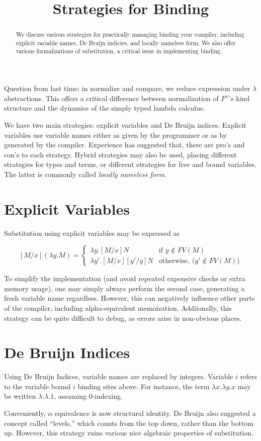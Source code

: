 \documentclass{amsart}
\title{Strategies for Binding}
\newcommand{\defn}[1]{\textit{#1}}
\begin{document}
\maketitle

\begin{abstract}
  We discuss various strategies for practically managing binding your compiler, including explicit variable names, De Bruijn indicies, and locally nameless form. We also offer various formalizations of substitution, a critical issue in implementing binding.
\end{abstract}

Question from last time: in normalize and compare, we reduce expression under $\lambda$ abstractions. This offers a critical difference between normalization of $F^\omega$'s kind structure and the dynamics of the simply typed lambda calculus.

We have two main strategies: explicit variables and De Bruijn indices. Explicit variables use variable names either as given by the programmer or as by generated by the compiler. Experience has suggested that, there are pro's and con's to each strategy. Hybrid strategies may also be used, placing different strategies for types and terms, or different strategies for free and bound variables. The latter is commonly called \defn{locally nameless form}.

\section{Explicit Variables}

Substitution using explicit variables may be expressed as

\[
  [M/x](\lambda y. M) = \begin{cases}
  \lambda y. [M/x]N& \text{if $y \not\in FV(M)$}\\
  \lambda y'. [M/x][y'/y]N& \text{otherwise, ($y' \not\in FV(M)$)}
  \end{cases}
\]

To simplify the implementation (and avoid repeated expensive checks or extra memory usage), one may simply always perform the second case, generating a fresh variable name regardless. However, this can negatively influence other parts of the compiler, including alpha-equivalent memoization. Addiionally, this strategy can be quite difficult to debug, as errors arise in non-obvious places.

\section{De Bruijn Indices}
Using De Bruijn Indices, variable names are replaced by integers. Variable $i$ refers to the variable bound $i$ binding sites above. For instance, the term $\lambda x. \lambda y. x$ may be written $\lambda. \lambda. 1$, assuming 0-indexing.

Conveniently, $\alpha$ equivalence is now structural identity. De Bruijn also suggested a concept called ``levels,'' which counts from the top down, rather than the bottom up. However, this strategy ruins various nice algebraic properties of substitution.
\end{document}
